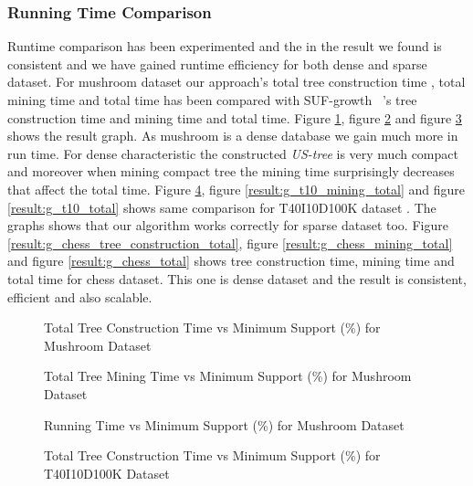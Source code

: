     \subsubsection{Running Time Comparison}
    Runtime comparison has been experimented and the in the result we found is consistent and we have gained runtime efficiency for both dense and sparse dataset. For mushroom dataset our approach's total tree construction time , total mining time and total time has been compared with SUF-growth ~\cite{suf_growth}'s tree construction time and mining time and total time. Figure \ref{result:g_m_tree_construction_total}, figure \ref{result:g_m_mining_total} and figure \ref{result:g_m_total} shows the result graph. As mushroom is a dense database we gain much more in run time. For dense characteristic the constructed \emph{US-tree} is very much compact and moreover when mining compact tree the mining time surprisingly decreases that affect the total time. Figure \ref{result:g_t10_tree_construction_total}, figure \ref{result:g_t10_mining_total} and figure \ref{result:g_t10_total} shows same comparison for T40I10D100K dataset . The graphs shows that our algorithm works correctly for sparse dataset too. Figure \ref{result:g_chess_tree_construction_total}, figure \ref{result:g_chess_mining_total} and figure \ref{result:g_chess_total} shows tree construction time, mining time and total time for chess dataset. This one is dense dataset and the result is consistent, efficient and also scalable.
            \begin{figure}[h]
            \centering
                
            \caption{Total Tree Construction Time vs Minimum Support (\%) for Mushroom Dataset }
            \label{result:g_m_tree_construction_total}
            \end{figure}
            
            \begin{figure}[h]
            \centering
                
            \caption{Total Tree Mining Time vs Minimum Support (\%) for Mushroom Dataset }
            \label{result:g_m_mining_total}
            \end{figure}
            \begin{figure}[h]
            \centering
                
            \caption{Running Time vs Minimum Support (\%) for Mushroom Dataset }
            \label{result:g_m_total}
            \end{figure}
            \begin{figure}[h]
            \centering
                
            \caption{Total Tree Construction Time vs Minimum Support (\%) for T40I10D100K Dataset }
            \label{result:g_t10_tree_construction_total}
            \end{figure}
            
